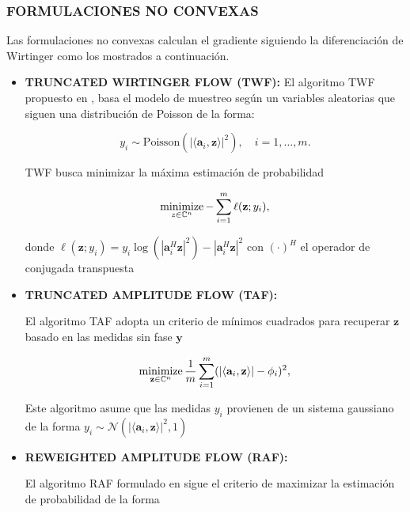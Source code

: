 \subsubsection{FORMULACIONES NO CONVEXAS}
Las formulaciones no convexas calculan el gradiente siguiendo la diferenciación de Wirtinger como los mostrados a continuación.
\begin{itemize}
    \item \textbf{TRUNCATED WIRTINGER FLOW (TWF):}
    El algoritmo TWF propuesto en \cite{chen2017solving}, basa el modelo de muestreo según un variables aleatorias que siguen una distribución de Poisson de la forma:
    
    \begin{equation}
        y_i\sim \mathrm{Poisson}( \vert \langle \mathbf{a}_i,\mathbf{z}\rangle \vert^2 ), \quad i=1,\dots,m.
    \end{equation}
    
    TWF busca minimizar la máxima estimación de probabilidad 
    
    \begin{equation}
        \operatorname*{minimize}_{z \in \mathbb{C}^{n}} - \sum_{i=1}^{m} \ell(\mathbf{z};y_i),
    \end{equation}
    
    donde $\ell(\mathbf{z};y_i) = { y_i\log(|\mathbf{a}_i^H \mathbf{z}|^2) -|\mathbf{a}_i^H \mathbf{z}|^2 }$ con $(\cdot)^H$ el operador de conjugada transpuesta
    
    \item \textbf{TRUNCATED AMPLITUDE FLOW (TAF):}

    El algoritmo TAF \cite{wang2017solving} adopta un criterio de mínimos cuadrados para recuperar $\mathbf{z}$ basado en las medidas sin fase $\mathbf{y}$ 
    
    \begin{equation}
        \operatorname*{minimize}_{\mathbf{z} \in \mathbb{C}^{n}} \frac{1}{m} \sum_{i=1}^{m} (\vert \langle \mathbf{a}_i,\mathbf{z}\rangle \vert - \phi_i)^2,
    \end{equation}
    
    Este algoritmo asume que las medidas $y_i$ provienen de un sistema gaussiano de la forma $y_i \sim \mathcal{N}(\vert \langle \mathbf{a}_i,\mathbf{z}\rangle \vert^2, 1)$
    
    \item \textbf{REWEIGHTED AMPLITUDE FLOW (RAF):}

    El algoritmo RAF formulado en \cite{wang2018phase} sigue el criterio de maximizar la estimación de probabilidad de la forma
    

\end{itemize}
